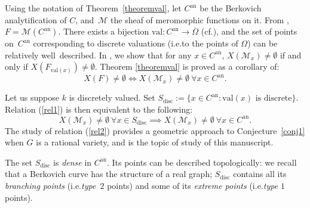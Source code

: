 \documentclass[10pt]{amsart}
\newcommand{\ie}{i.e.}
\newcommand{\cf}{cf.}
\newcommand{\val}{\mathrm{val}}
\theoremstyle{definition}
\begin{document}
Using the notation of Theorem~\ref{theoremval}, let $C^{\mathrm{an}}$ be the Berkovich analytification of $C$, and~$\mathscr{M}$ the sheaf of meromorphic functions on it. From \cite[Prop.\,3.6.2]{Ber90}, $F=\mathscr{M}(C^{\mathrm{an}})$. There exists a bijection $\val: C^{\mathrm{an}} \to \overline{\Omega}$ (\cf \cite[Prop.\,3.15]{une}), and the set of points on~$C^{\mathrm{an}}$ corresponding to discrete valuations (\ie to the points of $\Omega$) can be relatively well~described.
In \cite[Cor.\,3.17]{une}, we show that for any $x \in C^{\mathrm{an}}$, $X(\mathscr{M}_x) \neq \emptyset$ if and only if $X(F_{\val(x)}) \neq \emptyset$.
Theorem \ref{theoremval} is proved as a corollary of:
\[X(F) \neq \emptyset \iff X(\mathscr{M}_x) \neq \emptyset \ \forall x \in C^{\mathrm{an}}.\]

Let us suppose $k$ is discretely valued.
Set $S_{\mathrm{disc}}:=\{x \in C^{\mathrm{an}} : \val(x) \text{ is discrete}\}$. Relation (\ref{rel1}) is then equivalent to the following:
\begin{equation}\label{rel2} {X(\mathscr{M}_x) \neq \emptyset} \ {\forall x \in S_{\mathrm{disc}}} \implies
X(\mathscr{M}_x) \neq \emptyset \ \forall x \in C^{\mathrm{an}}.
\end{equation}
The study of relation (\ref{rel2}) provides a geometric approach to Conjecture~\ref{conj1} when $G$ is a rational variety, and is the topic of study of this manuscript.

The set $S_{\mathrm{disc}}$ is \emph{dense} in $C^{\mathrm{an}}$. Its points can be described topologically: we recall that a Berkovich curve has the structure of a real graph; $S_{\mathrm{disc}}$ contains all its \emph{branching points} (\ie \emph{type~$2$} points) and some of its \emph{extreme points} (\ie \emph{type $1$} points).
\end{document}
